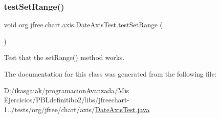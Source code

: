 \subsubsection{\texorpdfstring{test\+Set\+Range()}{testSetRange()}}
{\footnotesize\ttfamily void org.\+jfree.\+chart.\+axis.\+Date\+Axis\+Test.\+test\+Set\+Range (\begin{DoxyParamCaption}{ }\end{DoxyParamCaption})}

Test that the set\+Range() method works. 

The documentation for this class was generated from the following file\+:\begin{DoxyCompactItemize}
\item 
D\+:/ikasgaiak/programacion\+Avanzada/\+Mis Ejercicios/\+P\+B\+Ldefinitibo2/libs/jfreechart-\/1../tests/org/jfree/chart/axis/\mbox{\hyperlink{_date_axis_test_8java}{Date\+Axis\+Test.\+java}}\end{DoxyCompactItemize}
